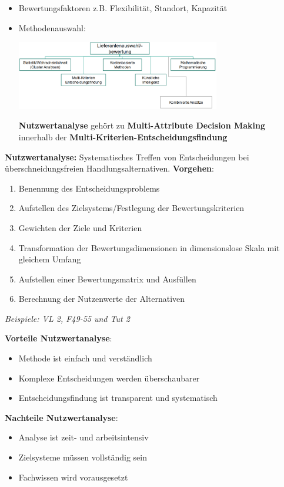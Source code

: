 \begin{enumerate}
\begin{itemize}
\begin{center}
		\end{center}
		\item Bewertungsfaktoren z.B. Flexibilität, Standort, Kapazität
		\item Methodenauswahl:
		\begin{center}
			\includegraphics[width=0.7\textwidth]{images/methods.png}
		\end{center}
		\textbf{Nutzwertanalyse} gehört zu \textbf{Multi-Attribute Decision Making} innerhalb der \textbf{Multi-Kriterien-Entscheidungsfindung}
	\end{itemize}
\end{enumerate}
\bigskip
\textbf{Nutzwertanalyse:} Systematisches Treffen von Entscheidungen bei überschneidungsfreien Handlungsalternativen. \textbf{Vorgehen}:
\begin{enumerate}
	\item Benennung des Entscheidungsproblems
	\item Aufstellen des Zielsystems/Festlegung der Bewertungskriterien
	\item Gewichten der Ziele und Kriterien
	\item Transformation der Bewertungsdimensionen in dimensionslose Skala mit gleichem Umfang
	\item Aufstellen einer Bewertungsmatrix und Ausfüllen
	\item Berechnung der Nutzenwerte der Alternativen 
\end{enumerate}

\textit{Beispiele: VL 2, F49-55 und Tut 2}

\pagebreak
\textbf{Vorteile Nutzwertanalyse}: 
\begin{itemize}
	\item Methode ist einfach und verständlich
	\item Komplexe Entscheidungen werden überschaubarer
	\item Entscheidungsfindung ist transparent und systematisch
\end{itemize} 

\textbf{Nachteile Nutzwertanalyse}:
\begin{itemize}
	\item Analyse ist zeit- und arbeitsintensiv
	\item Zielsysteme müssen vollständig sein
	\item Fachwissen wird vorausgesetzt
\end{itemize}
